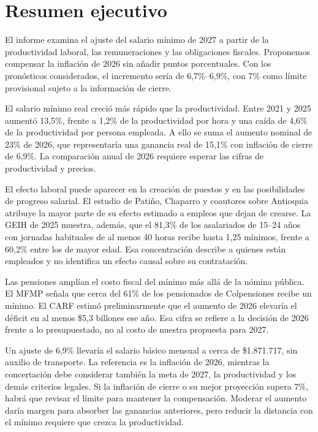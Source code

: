 \section*{Resumen ejecutivo}

El informe examina el ajuste del salario mínimo de 2027 a partir de la productividad laboral, las remuneraciones y las obligaciones fiscales. Proponemos compensar la inflación de 2026 sin añadir puntos porcentuales. Con los pronósticos considerados, el incremento sería de 6,7\%--6,9\%, con 7\% como límite provisional sujeto a la información de cierre.

El salario mínimo real creció más rápido que la productividad. Entre 2021 y 2025 aumentó 13,5\%, frente a 1,2\% de la productividad por hora y una caída de 4,6\% de la productividad por persona empleada. A ello se suma el aumento nominal de 23\% de 2026, que representaría una ganancia real de 15,1\% con inflación de cierre de 6,9\%. La comparación anual de 2026 requiere esperar las cifras de productividad y precios.\cite{ipc,productividad,salarios,decreto1469,juntaOctubre}

El efecto laboral puede aparecer en la creación de puestos y en las posibilidades de progreso salarial. El estudio de Patiño, Chaparro y coautores sobre Antioquia atribuye la mayor parte de su efecto estimado a empleos que dejan de crearse. La GEIH de 2025 muestra, además, que el 81,3\% de los asalariados de 15--24 años con jornadas habituales de al menos 40 horas recibe hasta 1,25 mínimos, frente a 60,2\% entre los de mayor edad. Esa concentración describe a quienes están empleados y no identifica un efecto causal sobre su contratación.\cite{chaparro,orozcoGEIH}

Las pensiones amplían el costo fiscal del mínimo más allá de la nómina pública. El MFMP señala que cerca del 61\% de los pensionados de Colpensiones recibe un mínimo. El CARF estimó preliminarmente que el aumento de 2026 elevaría el déficit en al menos \$5,3 billones ese año. Esa cifra se refiere a la decisión de 2026 frente a lo presupuestado, no al costo de nuestra propuesta para 2027.\cite{mfmp2026,carf22}

Un ajuste de 6,9\% llevaría el salario básico mensual a cerca de \$1.871.717, sin auxilio de transporte. La referencia es la inflación de 2026, mientras la concertación debe considerar también la meta de 2027, la productividad y los demás criterios legales. Si la inflación de cierre o su mejor proyección supera 7\%, habrá que revisar el límite para mantener la compensación. Moderar el aumento daría margen para absorber las ganancias anteriores, pero reducir la distancia con el mínimo requiere que crezca la productividad.\cite{ley278,c815}
\clearpage
